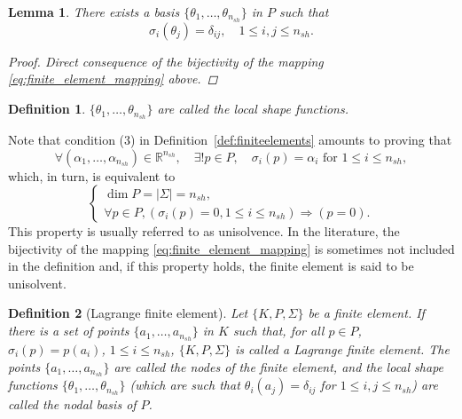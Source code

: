 \documentclass{article}
\newtheorem{definition}{Definition}
\newtheorem{lemma}{Lemma}
\begin{document}
\begin{lemma}\label{lemma:basis_from_bijectivity}
    There exists a basis $\{\theta_1, \dots, \theta_{n_{sh}}\}$ in $P$ such that
    $$ \sigma_i(\theta_j) = \delta_{ij}, \quad 1 \le i,j \le n_{sh}. $$
    \begin{proof}
        Direct consequence of the bijectivity of the mapping \eqref{eq:finite_element_mapping} above.
    \end{proof}
\end{lemma}


\begin{definition}
    $\{\theta_1, \dots, \theta_{n_{sh}}\}$ are called the local shape functions.
\end{definition}

Note that condition (3) in Definition~\ref{def:finiteelements} amounts to proving that
    $$ \forall(\alpha_1, \dots, \alpha_{n_{sh}}) \in \mathbb{R}^{n_{sh}}, \quad \exists ! p \in P, \quad \sigma_i(p) = \alpha_i \text{ for } 1 \le i \le n_{sh}, $$
    which, in turn, is equivalent to
    $$ \begin{cases} \dim P = |\Sigma| = n_{sh}, \\ \forall p \in P, (\sigma_i(p) = 0, 1 \le i \le n_{sh}) \Rightarrow (p = 0). \end{cases} $$
This property is usually referred to as unisolvence. In the literature, the bijectivity of the mapping \eqref{eq:finite_element_mapping} is sometimes not included in the definition and, if this property holds, the finite element is said to be unisolvent.

\begin{definition}[Lagrange finite element]\label{def:lagrange_finite_element}
    Let $\{K, P, \Sigma\}$ be a finite element. If there is a set of points $\{a_1, \dots, a_{n_{sh}}\}$ in $K$ such that, for all $p \in P$, $\sigma_i(p) = p(a_i)$, $1 \le i \le n_{sh}$, $\{K, P, \Sigma\}$ is called a Lagrange finite element. The points $\{a_1, \dots, a_{n_{sh}}\}$ are called the nodes of the finite element, and the local shape functions $\{\theta_1, \dots, \theta_{n_{sh}}\}$ (which are such that $\theta_i(a_j) = \delta_{ij}$ for $1 \le i,j \le n_{sh}$) are called the nodal basis of $P$.
\end{definition}
\end{document}
